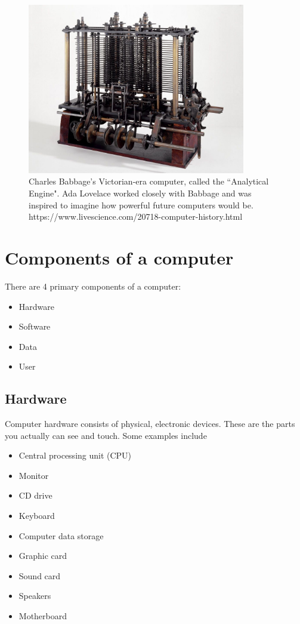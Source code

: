 \begin{figure}
	\centering
	\includegraphics[width=0.85\textwidth]{images/analytic_engine.jpg}
	\caption{Charles Babbage's Victorian-era computer, called the ``Analytical Engine". Ada Lovelace worked closely with Babbage and was inspired to imagine how powerful future computers would be. 
    https://www.livescience.com/20718-computer-history.html}
	\label{fig:analytic_engine}
\end{figure}

\section{Components of a computer}

There are 4 primary components of a computer:

\begin{itemize}
	\item Hardware
	\item Software
	\item Data
	\item User
\end{itemize}

\subsection{Hardware}

Computer hardware consists of physical, electronic devices. These are the parts you actually can see and touch. Some examples include

\begin{itemize}
	\item Central processing unit (CPU)
	\item Monitor
	\item CD drive
	\item Keyboard
	\item Computer data storage
	\item Graphic card
	\item Sound card
	\item Speakers
	\item Motherboard
\end{itemize}

